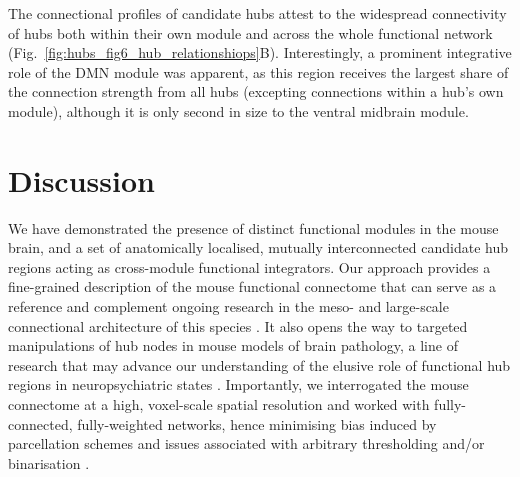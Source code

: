 The connectional profiles of candidate hubs attest to the widespread
connectivity of hubs both within their own module and across the whole
functional network (Fig.~\ref{fig:hubs_fig6_hub_relationshiops}B).
Interestingly, a prominent integrative role of the DMN module was apparent, as
this region receives the largest share of the connection strength from all hubs
(excepting connections within a hub’s own module), although it is only second in
size to the ventral midbrain module.

\section{Discussion}

We have demonstrated the presence of distinct functional modules in the mouse
brain, and a set of anatomically localised, mutually interconnected candidate
hub regions acting as cross-module functional integrators. Our approach provides
a fine-grained description of the mouse functional connectome that can serve as
a reference and complement ongoing research in the meso- and large-scale
connectional architecture of this species \parencite{oh2014, stafford2014,
zingg2014}. It
also opens the way to targeted manipulations of hub nodes in mouse models of
brain pathology, a line of research that may advance our understanding of the
elusive role of functional hub regions in neuropsychiatric states
\parencite{vandenheuvel2013}. Importantly, we interrogated the mouse connectome at a
high, voxel-scale spatial resolution and worked with fully-connected,
fully-weighted networks, hence minimising bias induced by parcellation schemes
and issues associated with arbitrary thresholding and/or binarisation
\parencite{bullmore2009}.


